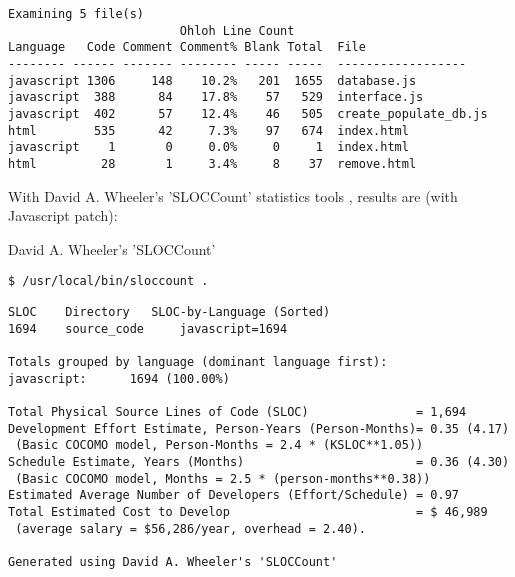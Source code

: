 \begin{shadowblock}{15cm}
 \begin{verbatim}
Examining 5 file(s)
                        Ohloh Line Count                              
Language   Code Comment Comment% Blank Total  File
-------- ------ ------- -------- ----- -----  ------------------
javascript 1306     148    10.2%   201  1655  database.js
javascript  388      84    17.8%    57   529  interface.js
javascript  402      57    12.4%    46   505  create_populate_db.js
html        535      42     7.3%    97   674  index.html
javascript    1       0     0.0%     0     1  index.html
html         28       1     3.4%     8    37  remove.html
\end{verbatim}
\end{shadowblock}

With David A. Wheeler's 'SLOCCount' statistics tools \cite{SLocCount}, results are (with Javascript patch\cite{SLocCountJS}):

 \begin{bclogo}[couleur=green!30,arrondi=0.1, logo=\bcpanchant,  ombre=true ] 
{ David A. Wheeler's 'SLOCCount'}   
\begin{verbatim}
$ /usr/local/bin/sloccount .
\end{verbatim}
\end{bclogo}

\begin{shadowblock}{15cm}
\begin{verbatim}
SLOC	Directory	SLOC-by-Language (Sorted)
1694    source_code     javascript=1694

Totals grouped by language (dominant language first):
javascript:      1694 (100.00%)

Total Physical Source Lines of Code (SLOC)               = 1,694
Development Effort Estimate, Person-Years (Person-Months)= 0.35 (4.17)
 (Basic COCOMO model, Person-Months = 2.4 * (KSLOC**1.05))
Schedule Estimate, Years (Months)                        = 0.36 (4.30)
 (Basic COCOMO model, Months = 2.5 * (person-months**0.38))
Estimated Average Number of Developers (Effort/Schedule) = 0.97
Total Estimated Cost to Develop                          = $ 46,989
 (average salary = $56,286/year, overhead = 2.40).
 
Generated using David A. Wheeler's 'SLOCCount'
\end{verbatim}
\end{shadowblock}
